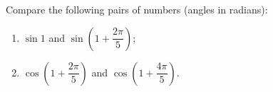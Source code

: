 Compare the following pairs of numbers (angles in radians):
\begin{enumerate}
\item[(a)] $\sin1$ and $\sin\left(1+\dfrac{2\pi}{5}\right)$;
\item[(b)] $\cos\left(1+\dfrac{2\pi}{5}\right)$ and $\cos\left(1+\dfrac{4\pi}{5}\right)$.
\end{enumerate}
